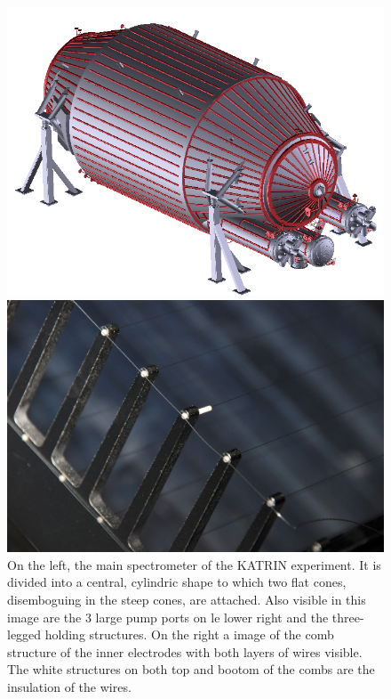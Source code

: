       \begin{figure}
      
      	\begin{minipage}{0.67\textwidth}
      		\includegraphics[width = \textwidth]{graphics/katrinExperiment/mainSpectrometer.jpg}
      	\end{minipage}
      	\begin{minipage}{0.29\textwidth}
      		\includegraphics[angle = 90, width = \textwidth]{graphics/katrinExperiment/wireElectrodes.png}
      	\end{minipage}
      	\caption[Main spectrometer and wire electrodes]{On the left, the main spectrometer of the KATRIN experiment. It is divided into a central, cylindric shape to which two flat cones, disemboguing in the steep cones, are attached. Also visible in this image are the 3 large pump ports on le lower right and the three-legged holding structures. On the right a image of the comb structure of the inner electrodes with both layers of wires visible. The white structures on both top and bootom of the combs are the insulation of the wires.}
      	\label{fig:mainSpec}
      \end{figure}
		
